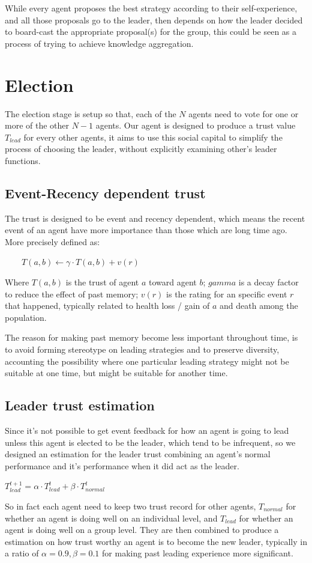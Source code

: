 While every agent proposes the best strategy according to their self-experience, and all those proposals go to the leader, then depends on how the leader decided to board-cast the appropriate proposal(s) for the group, this could be seen as a process of trying to achieve knowledge aggregation.

\section{Election}
The election stage is setup so that, each of the $N$ agents need to vote for one or more of the other $N-1$ agents. Our agent is designed to produce a trust value $T_{lead}$ for every other agents, it aims to use this social capital to simplify the process of choosing the leader, without explicitly examining other's leader functions.

\subsection{Event-Recency dependent trust}
The trust is designed to be event and recency dependent, which means the recent event of an agent have more importance than those which are long time ago. More precisely defined as:
\begin{center}
$\qquad T(a,b) \leftarrow \gamma \cdot T(a,b) + v(r)$   
\end{center}
Where $T(a,b)$ is the trust of agent $a$ toward agent $b$; $gamma$ is a decay factor to reduce the effect of past memory; $v(r)$ is the rating for an specific event $r$ that happened, typically related to health loss / gain of $a$ and death among the population.

The reason for making past memory become less important throughout time, is to avoid forming stereotype on leading strategies and to preserve diversity, accounting the possibility where one particular leading strategy might not be suitable at one time, but might be suitable for another time.

\subsection{Leader trust estimation}
Since it's not possible to get event feedback for how an agent is going to lead unless this agent is elected to be the leader, which tend to be infrequent, so we designed an estimation for the leader trust combining an agent's normal performance and it's performance when it did act as the leader.
\begin{center}
$T_{lead}^{t+1} = \alpha \cdot T_{lead}^t + \beta \cdot T_{normal}^t$    
\end{center}
So in fact each agent need to keep two trust record for other agents, $T_{normal}$ for whether an agent is doing well on an individual level, and $T_{lead}$ for whether an agent is doing well on a group level. They are then combined to produce a estimation on how trust worthy an agent is to become the new leader, typically in a ratio of $\alpha=0.9, \beta=0.1$ for making past leading experience more significant.

